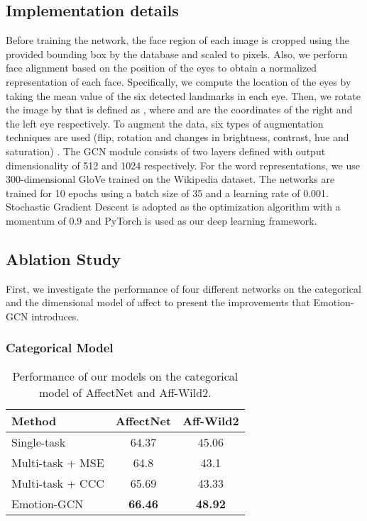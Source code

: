 \documentclass[a4paper, 10pt, conference]{ieeeconf}      \usepackage{FG2021}
\begin{document}
\subsection{Implementation details}

Before training the network, the face region of each image is cropped using the provided bounding box by the database and scaled to  pixels. Also, we perform face alignment based on the position of the eyes to obtain a normalized representation of each face. Specifically, we compute the location of the eyes by taking the mean value of the six detected landmarks in each eye. Then, we rotate the image by  that is defined as , where  and  are the coordinates of the right and the left eye respectively. To augment the data, six types of augmentation techniques are used (flip, rotation and changes in brightness, contrast, hue and saturation) \cite{hayale2019facial}. The GCN module consists of two layers defined with output dimensionality of 512 and 1024 respectively. For the word representations, we use 300-dimensional GloVe \cite{pennington2014glove} trained on the Wikipedia dataset. The networks are trained for 10 epochs using a batch size of 35 and a learning rate of 0.001. Stochastic Gradient Descent is adopted as the optimization algorithm with a momentum of 0.9 and PyTorch \cite{paszke2017automatic} is used as our deep learning framework.

\subsection{Ablation Study}

First, we investigate the performance of four different networks on the categorical and the dimensional model of affect to present the improvements that Emotion-GCN introduces.

\subsubsection{Categorical Model} 

\begin{table}[t]
  \caption{Performance of our models on the categorical model of AffectNet and Aff-Wild2.}
  \label{table:results_ours_cat}
  \begin{center}
  \begin{tabular}{lcc}
    \textbf{Method} & \textbf{AffectNet} & \textbf{Aff-Wild2} \\
    \toprule
    Single-task            & 64.37 & 45.06 \\
    Multi-task + MSE       & 64.8 & 43.1 \\
    Multi-task + CCC       & 65.69 & 43.33\\
    Emotion-GCN            & \textbf{66.46} & \textbf{48.92}\\
  \end{tabular}
  \end{center}
\end{table}
\end{document}
